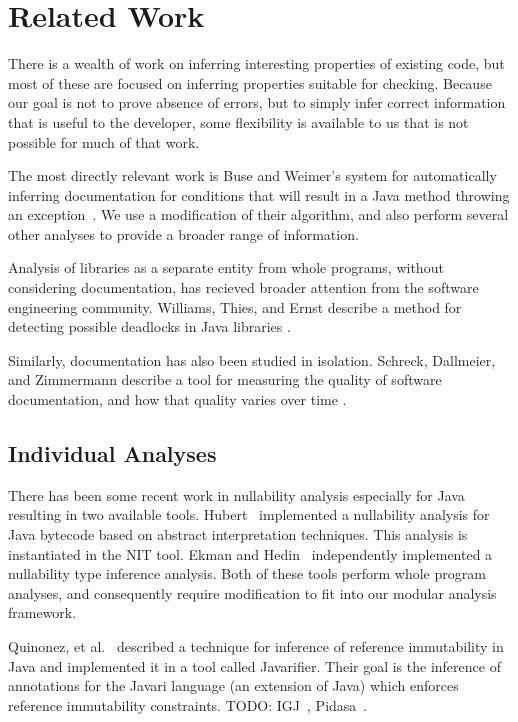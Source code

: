 \section{Related Work}
There is a wealth of work on inferring interesting properties of existing code,
but most of these are focused on inferring properties suitable for checking.
Because our goal is not to prove absence of errors, but to simply infer correct
information that is useful to the developer, some flexibility is available to us
that is not possible for much of that work.

The most directly relevant work is Buse and Weimer's system for automatically
inferring documentation for conditions that will result in a Java method
throwing an exception~\cite{autodoc}.  We use a modification of their
algorithm, and also perform several other analyses to provide a broader range
of information.

Analysis of libraries as a separate entity from whole programs, without
considering documentation, has recieved broader attention from the software
engineering community.  Williams, Thies, and Ernst describe a method for
detecting possible deadlocks in Java libraries \cite{deadlocklibs}.

Similarly, documentation has also been studied in isolation.  Schreck,
Dallmeier, and Zimmermann describe a tool for measuring the quality of software
documentation, and how that quality varies over time \cite{evolvedoc}.

\subsection{Individual Analyses}

There has been some recent work in nullability analysis especially for Java resulting in two available tools.  Hubert~\cite{NIT} implemented a nullability analysis for Java bytecode based on abstract interpretation techniques.  This analysis is instantiated in the {\sc NIT} tool.  Ekman and Hedin~\cite{NonNullTypeInference} independently implemented a nullability type inference analysis.  Both of these tools perform whole program analyses, and consequently require modification to fit into our modular analysis framework.

Quinonez, et al.~\cite{Javarifier} described a technique for inference of
reference immutability in Java and implemented it in a tool called {\sc
  Javarifier}. Their goal is the inference of annotations for the {\sc Javari}
language (an extension of Java) which enforces reference immutability
constraints. TODO: IGJ~\cite{IGJ}, Pidasa~\cite{Pidasa}.

